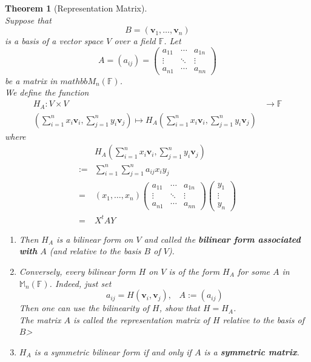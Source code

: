 \documentclass[12pt]{article}
\newtheorem{theorem}{Theorem}[section]
\theoremstyle{definition}
\begin{document}
\begin{theorem}[Representation Matrix]
\hfill\\\normalfont Suppose that
\[
B=(\mathbf{v}_1,\ldots,\mathbf{v}_n)
\]
is a basis of a vector space $V$ over a field $\mathbb{F}$. Let
\[
A=(a_{ij})=\begin{pmatrix}
a_{11}&\cdots&a_{1n}\\
\vdots&\ddots&\vdots\\
a_{n1}&\cdots&a_{nn}
\end{pmatrix}
\]
be a matrix in $mathbb{M}_n(\mathbb{F})$.\\
We define the function
\[
\begin{aligned}
H_A:V\times V&\to\mathbb{F}\\
(\sum_{i=1}^n x_i\mathbf{v}_i,\sum_{j=1}^n y_i\mathbf{v}_j)\mapsto H_A(\sum_{i=1}^n x_i\mathbf{v}_i,\sum_{j=1}^n y_i\mathbf{v}_j)
\end{aligned}
\]
where
\[
\begin{aligned}
& H_A(\sum_{i=1}^n x_i\mathbf{v}_i,\sum_{j=1}^n y_i\mathbf{v}_j)\\
:=&\sum_{i=1}^n\sum_{j=1}^n a_{ij}x_i y_j\\
=&(x_1,\ldots,x_n)\begin{pmatrix}
a_{11}&\cdots&a_{1n}\\
\vdots&\ddots&\vdots\\
a_{n1}&\cdots&a_{nn}
\end{pmatrix}\begin{pmatrix}
y_1\\
\vdots\\
y_n
\end{pmatrix}\\
=&X^tAY
\end{aligned}
\]
\begin{enumerate}[label=(\arabic*)]
\item Then $H_A$ is a bilinear form on $V$ and called the \textbf{bilinear form associated with }$A$ (and relative to the basis $B$ of $V$).
\item Conversely, every bilinear form $H$ on $V$ is of the form $H_A$ for some $A$ in $\mathbb{M}_n(\mathbb{F})$. Indeed, just set 
\[
a_{ij}=H(\mathbf{v}_i,\mathbf{v}_j),\;\;\; A:=(a_{ij})
\]
Then one can use the bilinearity of $H$, show that $H=H_A$.\\
The matrix $A$ is called the representation matrix of $H$ relative to the basis of $B$>
\item $H_A$ is a symmetric bilinear form if and only if $A$ is a \textbf{symmetric matrix}.
\end{enumerate}
\end{theorem}
\end{document}
